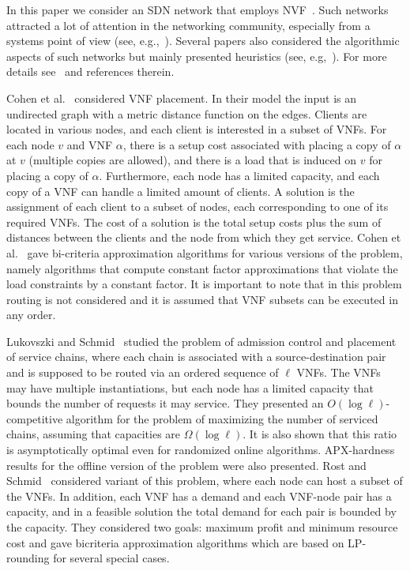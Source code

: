 \documentclass[11pt]{article}
\begin{document}
In this paper we consider an SDN network that employs
NVF~\cite{SDN-NFV15}.  Such networks attracted a lot of attention in
the networking community, especially from a systems point of view
(see, e.g.,~\cite{GVPGKDA14,HVSBFTF15}).  Several papers also
considered the algorithmic aspects of such networks but mainly
presented heuristics (see, e.g,~\cite{soule2014merlin}).  For more
details see~\cite{ERS16} and references therein.

Cohen et al.~\cite{CLNR15} considered VNF placement.  In their model
the input is an undirected graph with a metric distance function on
the edges.  Clients are located in various nodes, and each client is
interested in a subset of VNFs.  For each node $v$ and VNF $\alpha$,
there is a setup cost associated with placing a copy of $\alpha$ at
$v$ (multiple copies are allowed), and there is a load that is induced
on $v$ for placing a copy of $\alpha$.  Furthermore, each node has a
limited capacity, and each copy of a VNF can handle a limited amount
of clients.  A solution is the assignment of each client to a subset
of nodes, each corresponding to one of its required VNFs.  The cost of
a solution is the total setup costs plus the sum of distances between
the clients and the node from which they get service.
%
Cohen et al.~\cite{CLNR15} gave bi-criteria approximation algorithms
for various versions of the problem, namely algorithms that compute
constant factor approximations that violate the load constraints by a
constant factor.
%
It is important to note that in this problem routing is not considered
and it is assumed that VNF subsets can be executed in any order.

Lukovszki and Schmid~\cite{LukovszkiSchmid15} studied the problem of
admission control and placement of service chains, where each chain is
associated with a source-destination pair and is supposed to be routed
via an ordered sequence of $\ell$ VNFs.  The VNFs may have multiple
instantiations, but each node has a limited capacity that bounds the
number of requests it may service.
%
They presented an $O(\log \ell)$-competitive algorithm for the problem
of maximizing the number of serviced chains, assuming that capacities
are $\Omega(\log \ell)$.
It is also shown that this ratio is asymptotically optimal even for
randomized online algorithms.  APX-hardness results for the offline
version of the problem were also presented.
%
Rost and Schmid~\cite{RostSchmid16} considered variant of this
problem, where each node can host a subset of the VNFs.  In addition,
each VNF has a demand and each VNF-node pair has a capacity, and in a
feasible solution the total demand for each pair is bounded by the
capacity.  They considered two goals: maximum profit and minimum
resource cost and gave bicriteria approximation algorithms which are
based on LP-rounding for several special cases.
\end{document}
